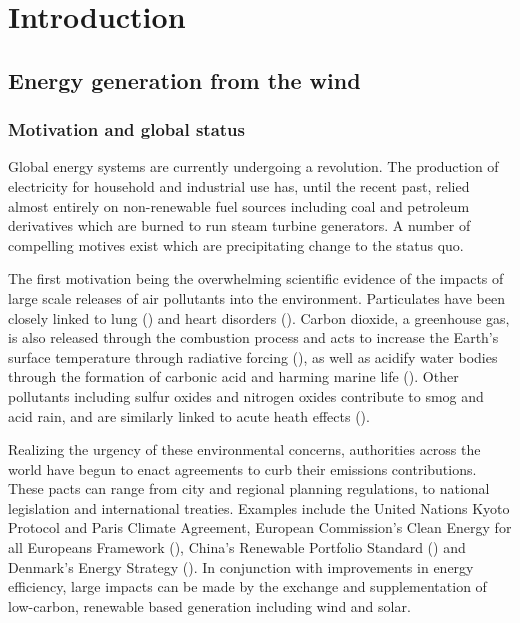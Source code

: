 \chapter{Introduction}
\label{sec:intro}

\clearpage
\section{Energy generation from the wind}
\label{sec:intro_engen}


\subsection{Motivation and global status}
\label{sec:intro_history}

Global energy systems are currently undergoing a revolution. The production of electricity for household and industrial use has, until the recent past, relied almost entirely on non-renewable fuel sources including coal and petroleum derivatives which are burned to run steam turbine generators. A number of compelling motives exist which are precipitating change to the status quo.

The first motivation being the overwhelming scientific evidence of the impacts of large scale releases of air pollutants into the environment. Particulates have been closely linked to lung (\cite{hamra_outdoor_2014}) and heart disorders (\cite{du_air_2016}). Carbon dioxide, a greenhouse gas, is also released through the combustion process and acts to increase the Earth's surface temperature through radiative forcing (\cite{charlson_climate_1992}), as well as acidify water bodies through the formation of carbonic acid and harming marine life (\cite{doney_ocean_2009}). Other pollutants including sulfur oxides and nitrogen oxides contribute to smog and acid rain, and are similarly linked to acute heath effects (\cite{brunekreef_air_2002}).

Realizing the urgency of these environmental concerns, authorities across the world have begun to enact agreements to curb their emissions contributions. These pacts can range from city and regional planning regulations, to national legislation and international treaties. Examples include the United Nations Kyoto Protocol and Paris Climate Agreement, European Commission's Clean Energy for all Europeans Framework (\cite{ec_clean_energy}), China's Renewable Portfolio Standard (\cite{china_rps}) and Denmark's Energy Strategy (\cite{danmark_energi}). In conjunction with improvements in energy efficiency, large impacts can be made by the exchange and supplementation of low-carbon, renewable based generation including wind and solar.


